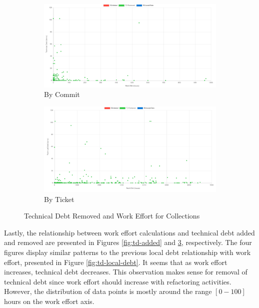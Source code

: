 \documentclass{mpaper}
\begin{document}
\begin{figure}
	\centering
	\begin{subfigure}{.45\textwidth}
		\includegraphics[width=\linewidth]{images/collections_removed_debt_commit.png}
		\caption{By Commit}
		\label{fig:td-removed-commit}
	\end{subfigure}
	\begin{subfigure}{.45\textwidth}
		\includegraphics[width=\linewidth]{images/collections_removed_debt_ticket.png}
		\caption{By Ticket}
		\label{fig:td-removed-ticket}
	\end{subfigure}
	\caption{Technical Debt Removed and Work Effort for Collections}
	\label{fig:td-removed}
\end{figure}

Lastly, the relationship between work effort calculations and technical debt
added and removed are presented in Figures \ref{fig:td-added} and
\ref{fig:td-removed}, respectively. The four figures display similar patterns to
the previous local debt relationship with work effort, presented in Figure
\ref{fig:td-local-debt}. It seems that as work effort increases, technical debt
decreases. This observation makes sense for removal of technical debt since work
effort should increase with refactoring activities. However, the distribution of
data points is mostly around the range $[0-100]$ hours on the work effort axis.\\
\end{document}
